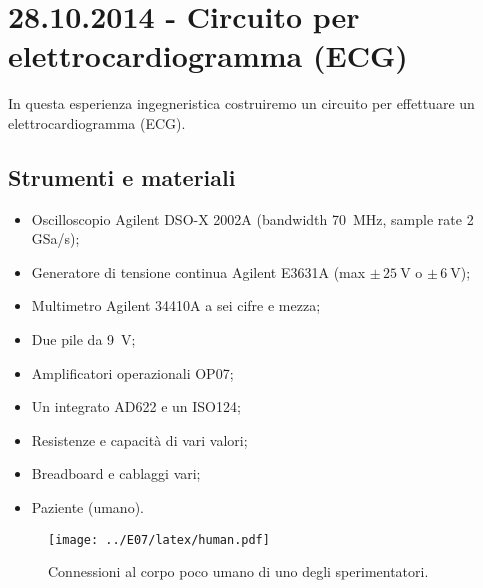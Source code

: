 \section{28.10.2014 - Circuito per elettrocardiogramma (ECG)}

In questa esperienza ingegneristica costruiremo un circuito per effettuare un elettrocardiogramma (ECG).

\subsection*{Strumenti e materiali}

\begin{itemize} [noitemsep]
	\item Oscilloscopio Agilent DSO-X 2002A (bandwidth \SI{70}{\mega\hertz}, sample rate \num{2} GSa/s);
		\item Generatore di tensione continua Agilent E3631A (max $\pm \, \SI{25}{\volt}$ o $\pm \, \SI{6}{\volt}$);
		\item Multimetro Agilent 34410A a sei cifre e mezza;
		\item Due pile da \SI{9}{\volt};
		\item Amplificatori operazionali OP07;
		\item Un integrato AD622 e un ISO124;
		\item Resistenze e capacità di vari valori;
		\item Breadboard e cablaggi vari;
		\item Paziente (umano).
\end{itemize}

\begin{wrapfigure}[20]{r}{0.24\textwidth}
\centering
\texttt{[image: ../E07/latex/human.pdf]}
\caption{Connessioni al corpo poco umano di uno degli sperimentatori.}
\label{fig7:human}
\end{wrapfigure}
